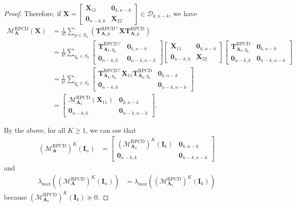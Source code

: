 \documentclass{article}
\theoremstyle{plain}
\theoremstyle{definition}
\theoremstyle{remark}
\newcommand{\RPCD}{\text{RPCD}} %
\newcommand{\MARPCD}{\mathcal{M}_{\bm{A}}^{\RPCD}} %
\def\vzero{{\bm{0}}}
\def\mA{{\bm{A}}}
\def\mI{{\bm{I}}}
\def\mT{{\bm{T}}}
\def\mX{{\bm{X}}}
\def\gD{{\mathcal{D}}}
\def\gM{{\mathcal{M}}}
\begin{document}
\begin{proof}
Therefore, if $\mX = 
\begin{bmatrix}
    \mX_{11} & \vzero_{k, n-k} \\
    \vzero_{n-k, k} & \mX_{22}
\end{bmatrix} \in \gD_{k, n-k}$, we have 
\begin{align*}
    \MARPCD(\mX) &= \frac{1}{n!} \sum_{p\in S_n} (\mT_{\mA, p}^{\RPCD \top} \mX \mT_{\mA, p}^{\RPCD}) \\
    &= \frac{1}{k!} \sum_{q_k\in S_k} 
    \begin{bmatrix}
        \mT_{\mA_k, q_k}^{\RPCD \top} & \vzero_{k, n-k}\\
        \vzero_{n-k, k} & \vzero_{n-k, n-k}
    \end{bmatrix} 
    \begin{bmatrix}
        \mX_{11} & \vzero_{k, n-k} \\
        \vzero_{n-k, k} & \mX_{22}
    \end{bmatrix}
    \begin{bmatrix}
        \mT_{\mA_k, q_k}^{\RPCD} & \vzero_{k, n-k}\\
        \vzero_{n-k, k} & \vzero_{n-k, n-k}
    \end{bmatrix} \\
    &= \frac{1}{k!} \sum_{q_k\in S_k} 
    \begin{bmatrix}
        \mT_{\mA_k, q_k}^{\RPCD \top} \mX_{11} \mT_{\mA_k, q_k}^{\RPCD} & \vzero_{k, n-k}\\
        \vzero_{n-k, k} & \vzero_{n-k, n-k}
    \end{bmatrix} \\
    &= 
    \begin{bmatrix}
        \gM_{\mA_k}^{\RPCD} (\mX_{11}) & \vzero_{k, n-k}\\
        \vzero_{n-k, k} & \vzero_{n-k, n-k}
    \end{bmatrix}.
\end{align*}

By the above, for all $K\ge 1$, we can see that 
\begin{align*}
    (\MARPCD)^K(\mI_n) &= 
    \begin{bmatrix}
        (\gM_{\mA_k}^{\RPCD})^K (\mI_k) & \vzero_{k, n-k}\\
        \vzero_{n-k, k} & \vzero_{n-k, n-k}
    \end{bmatrix}
\end{align*}
and 
\begin{align*}
    \lambda_{\max}((\MARPCD)^K(\mI_n)) &= \lambda_{\max}((\gM_{\mA_k}^{\RPCD})^K (\mI_k))
\end{align*}
because $(\gM_{\mA_k}^{\RPCD})^K (\mI_k) \succeq 0$. 


\end{proof}
\end{document}
